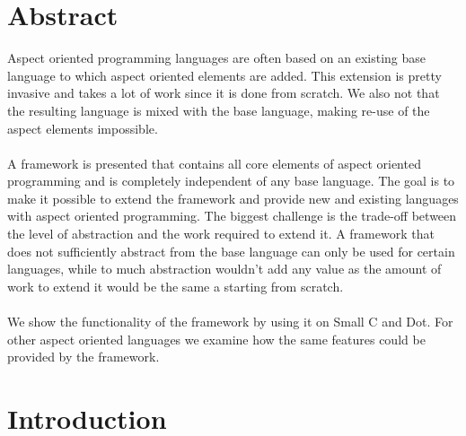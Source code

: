 \documentclass[a4paper]{report}
\begin{document}
\chapter*{Abstract}
Aspect oriented programming languages are often based on an existing base language to which aspect oriented elements are added. This extension is pretty invasive and takes a lot of work since it is done from scratch. We also not that the resulting language is mixed with the base language, making re-use of the aspect elements impossible.\\
\\
A framework is presented that contains all core elements of aspect oriented programming and is completely independent of any base language. The goal is to make it possible to extend the framework and provide new and existing languages with aspect oriented programming. The biggest challenge is the trade-off between the level of abstraction and the work required to extend it. A framework that does not sufficiently abstract from the base language can only be used for certain languages, while to much abstraction wouldn't add any value as the amount of work to extend it would be the same a starting from scratch.\\
\\
We show the functionality of the framework by using it on Small C and Dot. For other aspect oriented languages we examine how the same features could be provided by the framework.

\mainbodypages

\chapter{Introduction}
\end{document}
